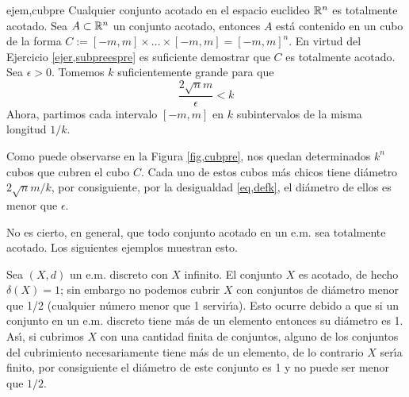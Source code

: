 \begin{ejemplo}{ejem,cubpre} Cualquier conjunto  acotado en el
espacio euclideo $\mathbb{R}^n$ es totalmente acotado. 
Sea
$A\subset\mathbb{R}^n$ un conjunto acotado, entonces $A$  está
contenido en un cubo de la forma $C:=[-m,m]\times\dots\times
[-m,m]=[-m,m]^n$. En virtud del Ejercicio \vref{ejer,subpreespre}
es suficiente demostrar que $C$ es totalmente acotado. Sea
$\epsilon>0$. Tomemos $k$ suficientemente grande para que
\begin{equation}\label{eq,defk}
	\frac{2\sqrt{n}m}{\epsilon}<k
\end{equation}
Ahora, partimos cada intervalo $[-m,m]$ en $k$ subintervalos de la
misma longitud $1/k$.



Como puede observarse en la Figura \ref{fig,cubpre}, nos quedan
determinados $k^n$ cubos que cubren el cubo $C$. Cada uno de estos
cubos más chicos tiene diámetro $2\sqrt{n}m/k$, por
consiguiente, por la desigualdad \ref{eq,defk}, el diámetro de
ellos es menor que $\epsilon$.
\end{ejemplo}

No es cierto, en general, que todo conjunto acotado en un e.m. sea
totalmente acotado. Los siguientes ejemplos muestran esto.

\begin{ejemplo}{} Sea $(X,d)$ un e.m. discreto con $X$ infinito. El
conjunto $X$ es acotado, de hecho $\delta(X)=1$; sin embargo no
podemos cubrir $X$ con conjuntos de diámetro menor que 1/2
(cualquier número menor que 1 servir\'{\i}a). Esto ocurre debido
a que si un conjunto en un e.m. discreto tiene más de un
elemento entonces su diámetro es 1. As\'{\i}, si cubrimos $X$
con una cantidad finita de conjuntos, alguno de los conjuntos del
cubrimiento necesariamente tiene más de un elemento, de lo
contrario $X$ ser\'{\i}a finito, por consiguiente el diámetro de
este conjunto es 1 y no puede ser menor que $1/2$.
\end{ejemplo}

